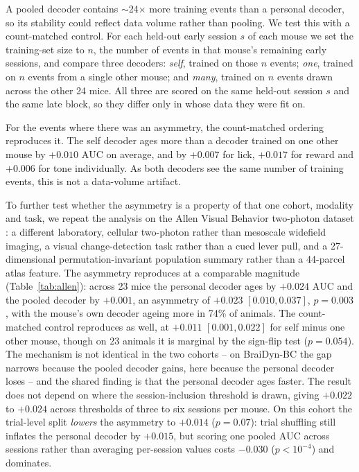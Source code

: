\documentclass[mlabstract,onecolumn]{jmlr}
\newcommand{\auc}{\mathrm{AUC}}
\begin{document}
A pooled decoder contains $\sim$24$\times$ more training events than a personal decoder, so its
stability could reflect data volume rather than pooling. We test this with a count-matched control. For each held-out early session $s$ of each mouse we set the
training-set size to $n$, the number of events in that mouse's remaining early sessions, and compare
three decoders: \emph{self}, trained on those $n$ events; \emph{one}, trained on $n$ events from a
single other mouse; and \emph{many}, trained on $n$ events drawn across the other 24 mice. All three
are scored on the same held-out session $s$ and the same late block, so they differ only in whose
data they were fit on.

For the events where there was an asymmetry, the count-matched ordering reproduces it. The self
decoder ages more than a decoder trained on one other mouse by $+0.010$ $\auc$ on average, and by
$+0.007$ for lick, $+0.017$ for reward and $+0.006$ for tone individually. As both decoders see the
same number of training events, this is not a data-volume artifact.

To further test whether the asymmetry is a property of that one cohort, modality and task, we repeat
the analysis on the Allen Visual Behavior two-photon dataset \citep{allenvb2023}: a different
laboratory, cellular two-photon rather than mesoscale widefield imaging, a visual change-detection
task rather than a cued lever pull, and a 27-dimensional permutation-invariant population summary
rather than a 44-parcel atlas feature. The asymmetry reproduces at a comparable magnitude
(Table~\ref{tab:allen}): across 23 mice the personal decoder ages by $+0.024$ $\auc$ and the pooled
decoder by $+0.001$, an asymmetry of $+0.023$ $[0.010, 0.037]$, $p = 0.003$, with the mouse's own
decoder ageing more in 74\% of animals. The count-matched control reproduces as well, at $+0.011$
$[0.001, 0.022]$ for self minus one other mouse, though on 23 animals it is marginal by the sign-flip
test ($p = 0.054$). The mechanism is not identical in the two cohorts -- on BraiDyn-BC the gap
narrows because the pooled decoder gains, here because the personal decoder loses -- and the shared
finding is that the personal decoder ages faster. The result does not depend on where the session-inclusion threshold is drawn, giving $+0.022$ to
$+0.024$ across thresholds of three to six sessions per mouse. On this cohort the trial-level split
\emph{lowers} the asymmetry to $+0.014$ ($p = 0.07$): trial shuffling still inflates the personal
decoder by $+0.015$, but scoring one pooled $\auc$ across sessions rather than averaging per-session
values costs $-0.030$ ($p < 10^{-4}$) and dominates.
\end{document}
